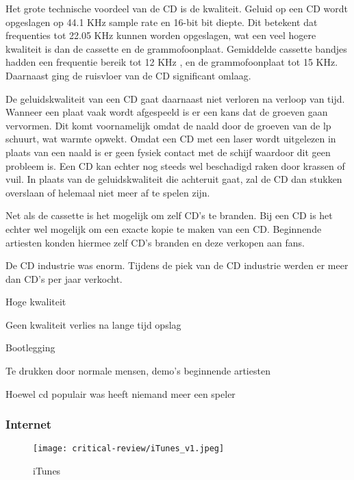 Het grote technische voordeel van de CD is de kwaliteit. Geluid op een CD wordt opgeslagen op 44.1 KHz sample rate en 16-bit bit diepte. Dit betekent dat frequenties tot 22.05 KHz kunnen worden opgeslagen, wat een veel hogere kwaliteit is dan de cassette en de grammofoonplaat. Gemiddelde cassette bandjes hadden een frequentie bereik tot 12 KHz \cite{van1970audio}, en de grammofoonplaat tot 15 KHz. Daarnaast ging de ruisvloer van de CD significant omlaag.

De geluidskwaliteit van een CD gaat daarnaast niet verloren na verloop van tijd. Wanneer een plaat vaak wordt afgespeeld is er een kans dat de groeven gaan vervormen. Dit komt voornamelijk omdat de naald door de groeven van de lp schuurt, wat warmte opwekt. Omdat een CD met een laser wordt uitgelezen in plaats van een naald is er geen fysiek contact met de schijf waardoor dit geen probleem is. Een CD kan echter nog steeds wel beschadigd raken door krassen of vuil. In plaats van de geluidskwaliteit die achteruit gaat, zal de CD dan stukken overslaan of helemaal niet meer af te spelen zijn.

Net als de cassette is het mogelijk om zelf CD's te branden. Bij een CD is het echter wel mogelijk om een exacte kopie te maken van een CD. Beginnende artiesten konden hiermee zelf CD's branden en deze verkopen aan fans.

De CD industrie was enorm. Tijdens de piek van de CD industrie werden er meer dan  CD's per jaar verkocht.


\begin{todolist}
    \item[\done] Hoge kwaliteit
    \item[\done] Geen kwaliteit verlies na lange tijd opslag
    \item Bootlegging
    \item[\done] Te drukken door normale mensen, demo's beginnende artiesten
    \item Hoewel cd populair was heeft niemand meer een speler
\end{todolist}

\subsubsection*{Internet}
\begin{wrapfigure}{r}{0.25\textwidth}
    \centering
    \texttt{[image: critical-review/iTunes\_v1.jpeg]}
    \caption{iTunes}
    \label{fig:critical-review:iTunes}
\end{wrapfigure}

